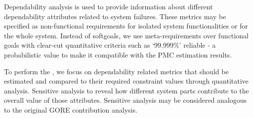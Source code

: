 Dependability analysis is used to provide information about different dependability attributes related to system failures. These metrics may be specified as non-functional requirements for isolated system functionalities or for the whole system. Instead of softgoals, we use meta-requirements over functional goals with clear-cut quantitative criteria such as `99.999\%' reliable - a probabilistic value to make it compatible with the PMC estimation results.

To perform the , we focus on dependability related metrics that should be estimated and compared to their required constraint values through quantitative analysis. Sensitive analysis to reveal how different system parts contribute to the overall value of those attributes. Sensitive analysis may be considered analogous to the original GORE contribution analysis.
